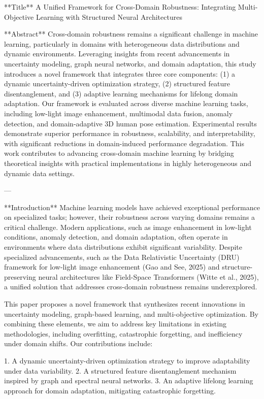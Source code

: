 **Title**  
A Unified Framework for Cross-Domain Robustness: Integrating Multi-Objective Learning with Structured Neural Architectures  

**Abstract**  
Cross-domain robustness remains a significant challenge in machine learning, particularly in domains with heterogeneous data distributions and dynamic environments. Leveraging insights from recent advancements in uncertainty modeling, graph neural networks, and domain adaptation, this study introduces a novel framework that integrates three core components: (1) a dynamic uncertainty-driven optimization strategy, (2) structured feature disentanglement, and (3) adaptive learning mechanisms for lifelong domain adaptation. Our framework is evaluated across diverse machine learning tasks, including low-light image enhancement, multimodal data fusion, anomaly detection, and domain-adaptive 3D human pose estimation. Experimental results demonstrate superior performance in robustness, scalability, and interpretability, with significant reductions in domain-induced performance degradation. This work contributes to advancing cross-domain machine learning by bridging theoretical insights with practical implementations in highly heterogeneous and dynamic data settings.  

---

**Introduction**  
Machine learning models have achieved exceptional performance on specialized tasks; however, their robustness across varying domains remains a critical challenge. Modern applications, such as image enhancement in low-light conditions, anomaly detection, and domain adaptation, often operate in environments where data distributions exhibit significant variability. Despite specialized advancements, such as the Data Relativistic Uncertainty (DRU) framework for low-light image enhancement (Gao and See, 2025) and structure-preserving neural architectures like Field-Space Transformers (Witte et al., 2025), a unified solution that addresses cross-domain robustness remains underexplored.  

This paper proposes a novel framework that synthesizes recent innovations in uncertainty modeling, graph-based learning, and multi-objective optimization. By combining these elements, we aim to address key limitations in existing methodologies, including overfitting, catastrophic forgetting, and inefficiency under domain shifts. Our contributions include:  

1. A dynamic uncertainty-driven optimization strategy to improve adaptability under data variability.  
2. A structured feature disentanglement mechanism inspired by graph and spectral neural networks.  
3. An adaptive lifelong learning approach for domain adaptation, mitigating catastrophic forgetting.  

